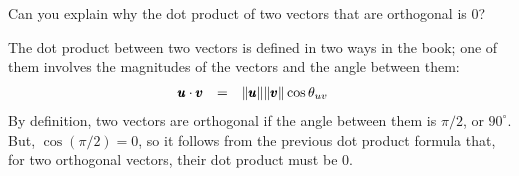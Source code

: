\documentclass[solutions.tex]{subfiles}
\begin{document}
\maketitle
\begin{exercise} Can you explain why the dot product of
two vectors that are orthogonal is $0$?
\end{exercise}
The dot product between two vectors is defined in two ways
in the book; one of them involves the magnitudes of the vectors
and the angle between them:
\begin{equation*} \begin{aligned}
	\pmb{u}\cdot\pmb{v} &&=\quad& \lVert \pmb{u} \rVert\lVert \pmb{v} \rVert\cos\theta_{uv}
\end{aligned} \end{equation*}
By definition, two vectors are orthogonal if the angle between
them is $\pi/2$, or $90^\circ$. But, $\cos(\pi/2) = 0$, so it follows
from the previous dot product formula that, for two orthogonal
vectors, their dot product must be $0$.
\end{document}
